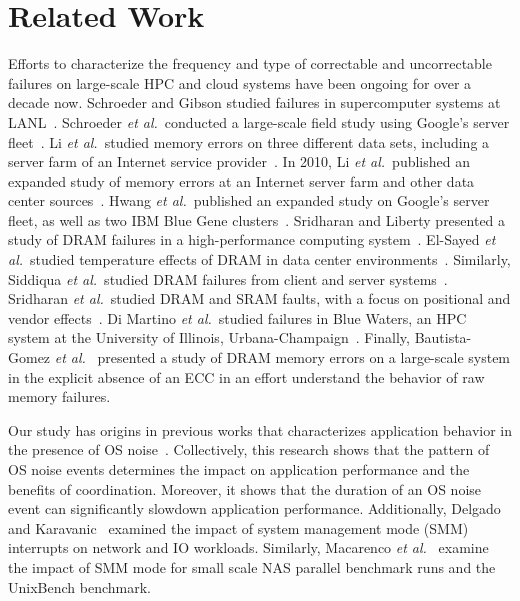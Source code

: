
\section{Related Work}
\label{sec:related}

Efforts to characterize the frequency and type of correctable and uncorrectable
failures on large-scale HPC and cloud systems have been ongoing for over a
decade now.  Schroeder and Gibson studied failures in supercomputer systems at
LANL~\cite{Schroeder:2006:Large-scale}.  Schroeder {\it et al.}~conducted a
large-scale field study using Google's server fleet~\cite{Schroeder09}.  Li {\it
et al.}~studied memory errors on three different data sets, including a server
farm of an Internet service provider~\cite{Li07}.  In 2010, Li {\it et
al.}~published an expanded study of memory errors at an Internet server farm and
other data center sources~\cite{Li10}.  Hwang {\it et al.}~published an expanded
study on Google's server fleet, as well as two IBM Blue Gene
clusters~\cite{Hwang12}.  Sridharan and Liberty presented a study of DRAM
failures in a high-performance computing system~\cite{Sridharan12}.  El-Sayed
{\it et al.}~studied temperature effects of DRAM in data center
environments~\cite{Elsayed12}.  Similarly, Siddiqua {\it et al.}~studied DRAM
failures from client and server systems~\cite{Siddiqua13}.  Sridharan {\it et
al.}~studied DRAM and SRAM faults, with a focus on positional and vendor
effects~\cite{Sridharan13}.  Di Martino {\it et al.}~studied failures in Blue
Waters, an HPC system at the University of Illinois,
Urbana-Champaign~\cite{bluewaters}.  Finally, Bautista-Gomez {\it et
al.}~\cite{Bautista-Gomez:2016:Unprotected} presented a study of DRAM memory
errors on a large-scale system in the explicit absence of an ECC in an effort
understand the behavior of raw memory failures.

Our study has origins in previous works that characterizes application behavior
in the presence of OS
noise~\cite{Ferreira:2008:Characterizing,Hoefler:2010:Characterizing}.
Collectively, this research shows that the pattern of OS noise events determines
the impact on application performance and the benefits of coordination.
Moreover, it shows that the duration of an OS noise event can significantly
slowdown application performance.  Additionally, Delgado and
Karavanic~\cite{Delgado:2013:SMM} examined the impact of system management mode
(SMM) interrupts on network and IO workloads.  Similarly, Macarenco {\it et
al.}~\cite{Macarenco:2016:Effects} examine the impact of SMM mode for small
scale NAS parallel benchmark runs and the UnixBench benchmark.



